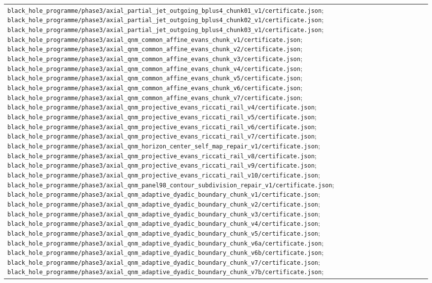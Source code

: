 \documentclass[11pt]{article}
\theoremstyle{definition}
\theoremstyle{remark}
\newcommand{\cert}[1]{\nolinkurl{#1}}
\begin{document}
{\begin{longtable}{@{}p{}p{}@{}}
\cert{black_hole_programme/phase3/axial_partial_jet_outgoing_bplus4_chunk01_v1/certificate.json};
\cert{black_hole_programme/phase3/axial_partial_jet_outgoing_bplus4_chunk02_v1/certificate.json};
\cert{black_hole_programme/phase3/axial_partial_jet_outgoing_bplus4_chunk03_v1/certificate.json};
\cert{black_hole_programme/phase3/axial_qnm_common_affine_evans_chunk_v1/certificate.json};
\cert{black_hole_programme/phase3/axial_qnm_common_affine_evans_chunk_v2/certificate.json};
\cert{black_hole_programme/phase3/axial_qnm_common_affine_evans_chunk_v3/certificate.json};
\cert{black_hole_programme/phase3/axial_qnm_common_affine_evans_chunk_v4/certificate.json};
\cert{black_hole_programme/phase3/axial_qnm_common_affine_evans_chunk_v5/certificate.json};
\cert{black_hole_programme/phase3/axial_qnm_common_affine_evans_chunk_v6/certificate.json};
\cert{black_hole_programme/phase3/axial_qnm_common_affine_evans_chunk_v7/certificate.json};
\cert{black_hole_programme/phase3/axial_qnm_projective_evans_riccati_rail_v4/certificate.json};
\cert{black_hole_programme/phase3/axial_qnm_projective_evans_riccati_rail_v5/certificate.json};
\cert{black_hole_programme/phase3/axial_qnm_projective_evans_riccati_rail_v6/certificate.json};
\cert{black_hole_programme/phase3/axial_qnm_projective_evans_riccati_rail_v7/certificate.json};
\cert{black_hole_programme/phase3/axial_qnm_horizon_center_self_map_repair_v1/certificate.json};
\cert{black_hole_programme/phase3/axial_qnm_projective_evans_riccati_rail_v8/certificate.json};
\cert{black_hole_programme/phase3/axial_qnm_projective_evans_riccati_rail_v9/certificate.json};
\cert{black_hole_programme/phase3/axial_qnm_projective_evans_riccati_rail_v10/certificate.json};
\cert{black_hole_programme/phase3/axial_qnm_panel98_contour_subdivision_repair_v1/certificate.json};
\cert{black_hole_programme/phase3/axial_qnm_adaptive_dyadic_boundary_chunk_v1/certificate.json};
\cert{black_hole_programme/phase3/axial_qnm_adaptive_dyadic_boundary_chunk_v2/certificate.json};
\cert{black_hole_programme/phase3/axial_qnm_adaptive_dyadic_boundary_chunk_v3/certificate.json};
\cert{black_hole_programme/phase3/axial_qnm_adaptive_dyadic_boundary_chunk_v4/certificate.json};
\cert{black_hole_programme/phase3/axial_qnm_adaptive_dyadic_boundary_chunk_v5/certificate.json};
\cert{black_hole_programme/phase3/axial_qnm_adaptive_dyadic_boundary_chunk_v6a/certificate.json};
\cert{black_hole_programme/phase3/axial_qnm_adaptive_dyadic_boundary_chunk_v6b/certificate.json};
\cert{black_hole_programme/phase3/axial_qnm_adaptive_dyadic_boundary_chunk_v7/certificate.json};
\cert{black_hole_programme/phase3/axial_qnm_adaptive_dyadic_boundary_chunk_v7b/certificate.json};

\end{longtable}}
\end{document}
